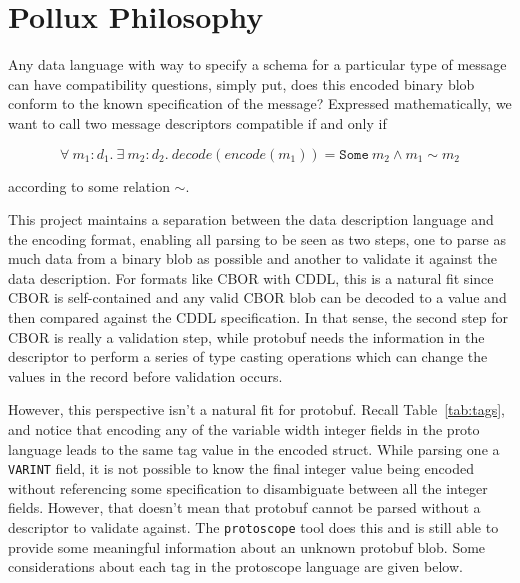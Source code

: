 \documentclass[11pt]{article}
\theoremstyle{definition}
\theoremstyle{plain}
\begin{document}
\section{Pollux Philosophy}

Any data language with way to specify a schema for a particular type of message
can have compatibility questions, simply put, does this encoded binary blob
conform to the known specification of the message? Expressed mathematically, we
want to call two message descriptors compatible if and only if

\[ \forall\ m_1:d_1.\ \exists\ m_2:d_2.\ decode(encode(m_1)) = \mathtt{Some}\ m_2 \wedge m_1 \sim m_2 \]

according to some relation $\sim$. 

This project maintains a separation between the data description language and
the encoding format, enabling all parsing to be seen as two steps, one to parse
as much data from a binary blob as possible and another to validate it against
the data description. For formats like CBOR with CDDL, this is a natural fit
since CBOR is self-contained and any valid CBOR blob can be decoded to a value
and then compared against the CDDL specification. In that sense, the second step
for CBOR is really a validation step, while protobuf needs the information in
the descriptor to perform a series of type casting operations which can change
the values in the record before validation occurs.

However, this perspective isn't a natural fit for protobuf. Recall
Table~\ref{tab:tags}, and notice that encoding any of the variable width integer
fields in the proto language leads to the same tag value in the encoded
struct. While parsing one a \texttt{VARINT} field, it is not possible to know
the final integer value being encoded without referencing some specification to
disambiguate between all the integer fields. However, that doesn't mean that
protobuf cannot be parsed without a descriptor to validate against. The
\texttt{protoscope} tool does this and is still able to provide some meaningful
information about an unknown protobuf blob. Some considerations about each tag
in the protoscope language are given below.
\end{document}
